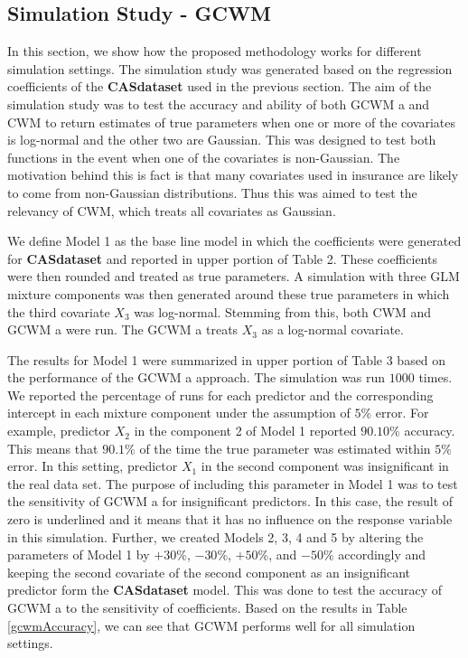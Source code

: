 \documentclass[11pt,letterpaper]{article}
\numberwithin{equation}{section}
\numberwithin{equation}{section}
\numberwithin{equation}{section}
\begin{document}
\subsection{Simulation Study - GCWM}


In this section, we show how the proposed methodology works for different simulation settings. The simulation study was generated based on the regression coefficients of the \textbf{CASdataset} used in the previous section. The aim of the simulation study was to test the accuracy and ability of both GCWM a and CWM to return estimates of true parameters when one or more of the covariates is log-normal and the other two are Gaussian. This was designed to test both functions in the event when one of the covariates is non-Gaussian. The motivation behind this is fact is that many covariates used in insurance are likely to come from non-Gaussian distributions. Thus this was aimed to test the relevancy of CWM, which treats all covariates as Gaussian.

We define Model 1 as the base line model in which the coefficients were generated for \textbf{CASdataset} and reported in upper portion of Table 2. These coefficients were then rounded and treated as true parameters. A simulation with three GLM mixture components was then generated around these true parameters in which the third covariate $X_3$ was log-normal. Stemming from this, both CWM and  GCWM a were run. The  GCWM a treats $X_3$ as a log-normal covariate. 

The results for Model 1 were summarized in upper portion of Table 3 based on the performance of the  GCWM a approach. The simulation was run $1000$ times. We reported the percentage of runs for each predictor and the corresponding intercept in each mixture component under the assumption of $5\%$ error. For example, predictor $X_2$ in the component 2 of Model 1 reported $90.10\%$ accuracy. This means that $90.1\%$ of the time the true parameter was estimated within $5\%$ error. In this setting, predictor $X_1$ in the second component was insignificant in the real data set. The purpose of including this parameter in Model 1 was to test the sensitivity of  GCWM a for insignificant predictors. In this case, the result of zero is underlined and it means that it has no influence on the response variable in this simulation. Further, we created Models 2, 3, 4 and 5 by altering the parameters of Model 1 by $+30\%$, $-30\%$, $+50\%$, and $-50\%$ accordingly and keeping the second covariate of the second component as an insignificant predictor form the \textbf{CASdataset} model. This was done to test the accuracy of  GCWM a to the  sensitivity of coefficients. Based on the results in Table \ref{gcwmAccuracy}, we can see that GCWM performs well for all simulation settings.
\end{document}
